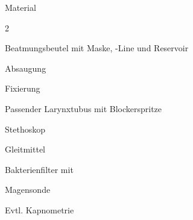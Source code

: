 {Material}
{
\begin{multicols}{2}
\begin{compactenum}
  \item Beatmungsbeutel mit Maske, -Line und Reservoir
  \item Absaugung
  \item Fixierung
  \item Passender Larynxtubus mit Blockerspritze
  \item Stethoskop
  \item Gleitmittel
  \item Bakterienfilter mit 
  \item Magensonde
  \item Evtl. Kapnometrie
\end{compactenum}
\end{multicols}
}
{}
{}
{}
{}



